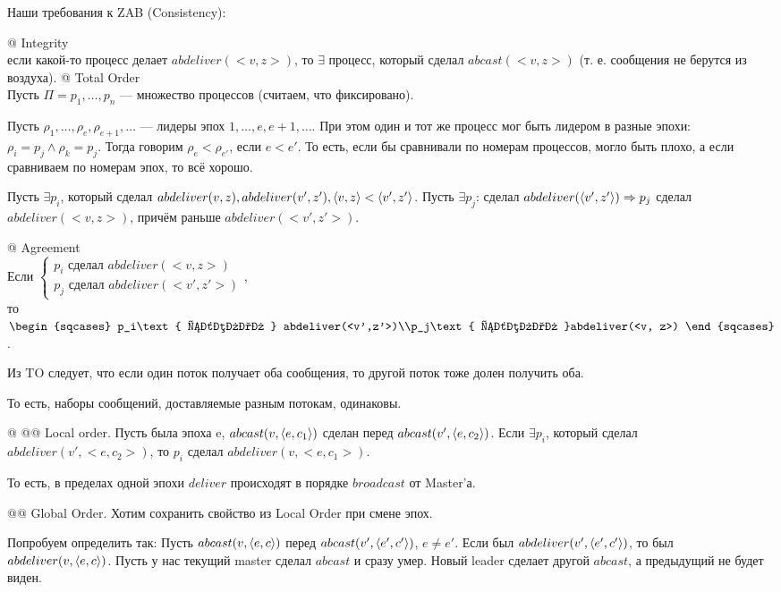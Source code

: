Наши требования к ZAB (Consistency):
\begin{el}[ol]
@ Integrity\\
если какой-то процесс делает $abdeliver(<v,z>)$, то $\exists$ процесс, который сделал $abcast(<v,z>)$ (т. е. сообщения не берутся из воздуха).
@ Total Order\\
Пусть $\Pi ={p_1, \dots, p_n}$ --- множество процессов (считаем, что фиксировано).

\begin{note}
Пусть $\rho_1, \dots, \rho_e, \rho_{e+1}, \dots$ --- лидеры эпох $1, \dots, e, e+1, \dots$.
При этом один и тот же процесс мог быть лидером в разные эпохи: $\rho_i = p_j \land \rho_k = p_j$. Тогда говорим
$\rho_e < \rho_{e'}$, если $e<e'$.
То есть, если бы сравнивали по номерам процессов, могло быть плохо, а если сравниваем по номерам эпох, то всё хорошо.
\end{note}

Пусть $\exists p_i$, который сделал $abdeliver(v, z), abdeliver(v', z'), \langle v, z\rangle < \langle v', z'\rangle$. Пусть $\exists p_j$: сделал $abdeliver(\langle v', z'\rangle) \Rightarrow p_j$ сделал $abdeliver(<v,z>)$, причём  раньше $abdeliver(<v', z'>)$.

@ Agreement\\
Если $\begin{cases} p_i\text{ сделал }abdeliver(<v,z>)\\ p_j\text{ сделал } abdeliver(<v',z'>)\end{cases}$,\\
то $\begin{sqcases} p_i\text{ сделал } abdeliver(<v',z'>)\\p_j\text{ сделал }abdeliver(<v, z>) \end{sqcases}$.
\begin{note}
Из TO следует, что если один поток получает оба сообщения, то другой поток тоже долен получить оба.
\end{note}
То есть, наборы сообщений, доставляемые разным потокам, одинаковы.

@
@@ Local order. 
Пусть была эпоха e, $abcast(v, \langle e,c_1\rangle)$ сделан перед $abcast(v', \langle e, c_2\rangle)$.
Если $\exists p_i$, который сделал $abdeliver(v', <e, c_2>)$, то $p_i$ сделал $abdeliver(v, <e, c_1>)$.

То есть, в пределах одной эпохи $deliver$ происходят в порядке $broadcast$ от Master'а.

@@ Global Order.
Хотим сохранить свойство из Local Order при смене эпох.
\begin{note}
Попробуем определить так:
Пусть $abcast(v, \langle e,c\rangle)$ перед $abcast(v', \langle e', c'\rangle)$, $e \ne e'$. Если был $abdeliver(v', \langle e', c'\rangle)$, то был $abdeliver(v, \langle e, c\rangle)$.
Пусть у нас текущий master сделал $abcast$ и сразу умер. Новый leader сделает другой $abcast$, а предыдущий не будет виден.
\end{note}


\end{el}

